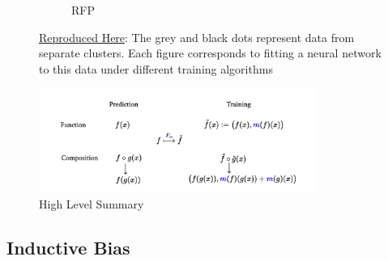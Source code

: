 \documentclass[a4paper,12pt]{article}
\begin{document}
\begin{figure}[htbp]
\begin{subfigure}{.32\textwidth}
        \caption{RFP}
    \label{fig:rfp}
\end{subfigure}
\caption{ \href{https://github.com/pharringtonp19/rfp/blob/main/notebooks/grad_desc_toy.ipynb}{Reproduced Here}: The grey and black dots represent data from separate clusters. Each figure corresponds to fitting a neural network to this data under different training algorithms}
\label{fig:mamlablation}
\end{figure}

\begin{figure}[htbp]
\centering
\includegraphics[width=0.8\textwidth]{figures/framework/cat.png}
        \caption{High Level Summary}
        \label{fig:hls}
\end{figure}
\subsection{Inductive Bias}
\end{document}
